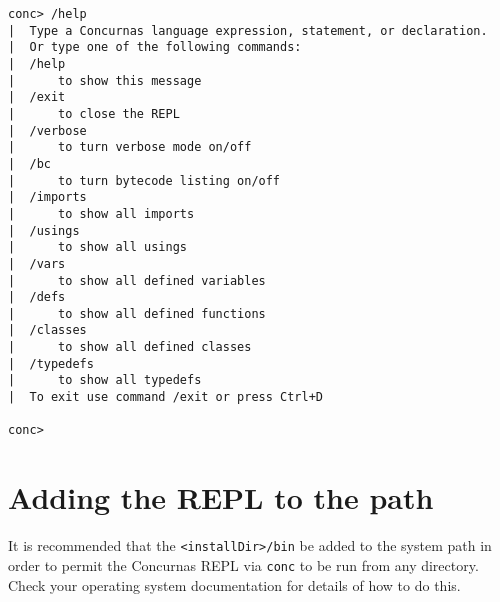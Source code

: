 \documentclass[conc-doc]{subfiles}
\begin{document}
\begin{lstlisting}[language=None]
conc> /help
|  Type a Concurnas language expression, statement, or declaration.
|  Or type one of the following commands:
|  /help
|      to show this message
|  /exit
|      to close the REPL
|  /verbose
|      to turn verbose mode on/off
|  /bc
|      to turn bytecode listing on/off
|  /imports
|      to show all imports
|  /usings
|      to show all usings
|  /vars
|      to show all defined variables
|  /defs
|      to show all defined functions
|  /classes
|      to show all defined classes
|  /typedefs
|      to show all typedefs
|  To exit use command /exit or press Ctrl+D

conc>
\end{lstlisting}

\section{Adding the REPL to the path}
It is recommended that the \lstinline[language=None]{<installDir>/bin} be added to the system path in order to permit the Concurnas REPL via \lstinline[language=None]{conc} to be run from any directory. Check your operating system documentation for details of how to do this.
	
\end{document}
